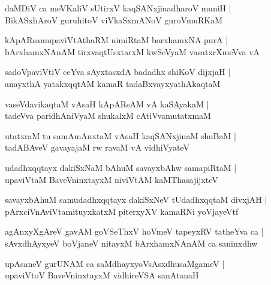 \documentclass[twoside,12pt,openright]{book}
\newcounter{shloka}[chapter]
\begin{document}
\begin{shloka}
daMDiV ca meVKaliV sUtirxV kaqSANxjinadharoV muniH |\\
BikASxhAroV guruhitoV viVkaSxmANoV guroVmuRKaM 
\end{shloka}

\begin{shloka}
kApARsamupaviVtAthaRM nimiRtaM barxhamxNA purA |\\
bArxhamxNAnAM tirxvaqtUsxtarxM kwSeVyaM vasatxrXmeVva vA 
\end{shloka}

\begin{shloka}
sadoVpaviVtiV ceYva sAyxtasxdA badadhx shiKoV dijxjaH |\\
anayxthA yatakxqqtAM kamaR tadaBxvayxyathAkaqtaM 
\end{shloka}

\begin{shloka}
vaseVdavikaqtaM vAsaH kApARsAM vA kaSAyakaM |\\
tadeVva paridhAniVyaM shukalxM cAtiVvamutatxmaM 
\end{shloka}

\begin{shloka}
utatxraM tu samAmAnxtaM vAsaH kaqSANxjinaM shuBaM |\\
tadABAveV gavayajaM rw ravaM vA vidhiVyateV 
\end{shloka}

\begin{shloka}
udadhxqqtayx dakiSxNaM bAhuM savayxbAhw samapiRtaM |\\
upaviVtaM BaveVninxtayxM niviVtAM kaMThasajijxteV 
\end{shloka}

\begin{shloka}
savayxbAhuM samudadhxqqtayx dakiSxNeV tUdadhxqqtaM divxjAH |\\
pArxciVnAviVtamituyxkatxM piterxyXV kamaRNi yoVjayeVtf 
\end{shloka}

\begin{shloka}
agAnxyXgAreV gavAM goVSeThxV hoVmeV tapeyxRV tatheYva ca |\\
sAvxdhAyxyeV boVjaneV nitayxM bArxhamxNAnAM ca saninxdhw
\end{shloka}

\begin{shloka}
upAsaneV gurUNAM ca saMdhayxyoVsAsxdhusaMgameV |\\
upaviVtoV BaveVninxtayxM vidhireVSA sanAtanaH 
\end{shloka}
\end{document}

